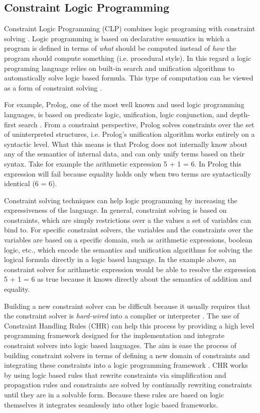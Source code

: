 \documentclass[12pt]{ucthesis}
\begin{document}
\subsection{Constraint Logic Programming}
Constraint Logic Programming (CLP) combines logic programing with constraint solving \cite{GavanelliCLP} \cite{WallaceCLP} \cite{Jaffar:1987:CLP}. Logic programming is based on declarative semantics in which a program is defined in terms of \emph{what} should be computed instead of \emph{how} the program should compute something (i.e. procedural style). In this regard a logic programing language relies on built-in search and unification algorithms to automatically solve logic based formula. This type of computation can be viewed as a form of constraint solving \cite{GavanelliCLP}. 

For example, Prolog, one of the most well known and used logic programming languages, is based on predicate logic, unification, logic conjunction, and depth-first search \cite{Sterling:1986}. From a constraint perspective, Prolog solves constraints over the set of uninterpreted structures, i.e. Prolog's unification algorithm works entirely on a syntactic level. What this means is that Prolog does not internally know about any of the semantics of internal data, and can only unify terms based on their syntax. Take for example the arithmetic expression 5 + 1 = 6. In Prolog this expression will fail because equality holds only when two terms are syntactically identical (6 = 6).  

Constraint solving techniques can help logic programming by increasing the expressiveness of the language. In general, constraint solving is based on constraints, which are simply restrictions over a the values a set of variables can bind to. For specific constraint solvers, the variables and the constraints over the variables are based on a specific domain, such as arithmetic expressions, boolean logic, etc., which encode the semantics and unification algorithms for solving the logical formula directly in a logic based language. In the example above, an constraint solver for arithmetic expression would be able to resolve the expression 5 + 1 = 6 as true because it knows directly about the semantics of addition and equality. 

Building a new constraint solver can be difficult because it usually requires that the constraint solver is \emph{hard-wired} into a complier or interpreter \cite{GavanelliCLP}. The use of Constraint Handling Rules (CHR) can help this process by providing a high level programming framework designed for the implementation and integrate constraint solvers into logic based languages. The aim is ease the process of building constraint solvers in terms of defining a new domain of constraints and integrating these constraints into a logic programming framework \cite{CHR}. CHR works by using logic based rules that rewrite constraints via simplification and propagation rules and constraints are solved by continually rewriting constraints until they are in a solvable form. Because these rules are based on logic themselves it integrates seamlessly into other logic based frameworks. 
\end{document}
